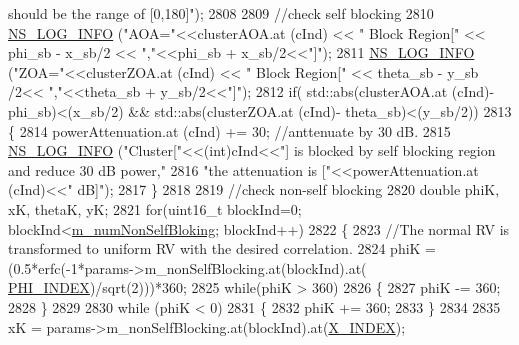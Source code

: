 \begin{DoxyCode}
{       should be the range of [0,180]"});
2808 
2809                 \textcolor{comment}{//check self blocking}
2810                 \hyperlink{group__logging_gafbd73ee2cf9f26b319f49086d8e860fb}{NS\_LOG\_INFO} (\textcolor{stringliteral}{"AOA="}<<clusterAOA.at (cInd) << \textcolor{stringliteral}{" Block Region["} << phi\_sb - x\_sb/2
      << \textcolor{stringliteral}{","}<<phi\_sb + x\_sb/2<<\textcolor{stringliteral}{"]"});
2811                 \hyperlink{group__logging_gafbd73ee2cf9f26b319f49086d8e860fb}{NS\_LOG\_INFO} (\textcolor{stringliteral}{"ZOA="}<<clusterZOA.at (cInd) << \textcolor{stringliteral}{" Block Region["} << theta\_sb - y\_sb
      /2<< \textcolor{stringliteral}{","}<<theta\_sb + y\_sb/2<<\textcolor{stringliteral}{"]"});
2812                 \textcolor{keywordflow}{if}( std::abs(clusterAOA.at (cInd)-phi\_sb)<(x\_sb/2) && std::abs(clusterZOA.at (cInd)-
      theta\_sb)<(y\_sb/2))
2813                 \{
2814                         powerAttenuation.at (cInd) += 30; \textcolor{comment}{//anttenuate by 30 dB.}
2815                         \hyperlink{group__logging_gafbd73ee2cf9f26b319f49086d8e860fb}{NS\_LOG\_INFO} (\textcolor{stringliteral}{"Cluster["}<<(\textcolor{keywordtype}{int})cInd<<\textcolor{stringliteral}{"] is blocked by self blocking
       region and reduce 30 dB power,"}
2816                                         \textcolor{stringliteral}{"the attenuation is ["}<<powerAttenuation.at (cInd)<<\textcolor{stringliteral}{" dB]"});
2817                 \}
2818 
2819                 \textcolor{comment}{//check non-self blocking}
2820                 \textcolor{keywordtype}{double} phiK, xK, thetaK, yK;
2821                 \textcolor{keywordflow}{for}(uint16\_t blockInd=0; blockInd<\hyperlink{classns3_1_1MmWave3gppChannel_addfe5e6c9d8e2531fe165ff86461d2d3}{m\_numNonSelfBloking}; blockInd++)
2822                 \{
2823                         \textcolor{comment}{//The normal RV is transformed to uniform RV with the desired correlation.}
2824                         phiK = (0.5*erfc(-1*params->m\_nonSelfBlocking.at(blockInd).at(
      \hyperlink{mmwave-3gpp-channel_8h_aac1933f496abe567e4380fc99112f6dc}{PHI\_INDEX})/sqrt(2)))*360;
2825                         \textcolor{keywordflow}{while}(phiK > 360)
2826                         \{
2827                                 phiK -= 360;
2828                         \}
2829 
2830                         \textcolor{keywordflow}{while} (phiK < 0)
2831                         \{
2832                                 phiK += 360;
2833                         \}
2834 
2835                         xK = params->m\_nonSelfBlocking.at(blockInd).at(\hyperlink{mmwave-3gpp-channel_8h_a023beaacdde3cbaf70604cf4da305e42}{X\_INDEX});

\end{DoxyCode}
